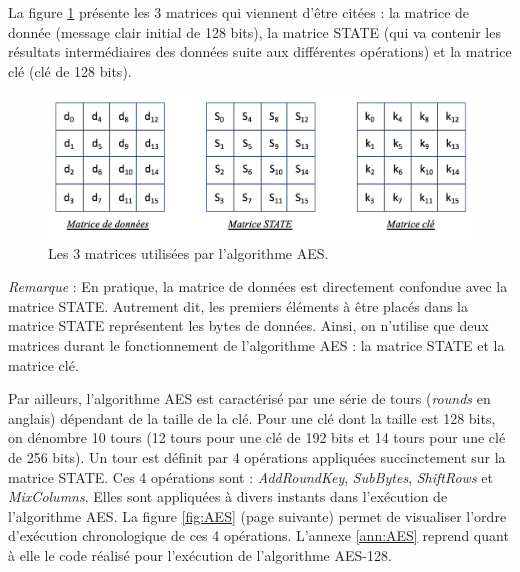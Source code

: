 \documentclass[oneside]{book}
\begin{document}
La figure \ref{fig:matrix} présente les 3 matrices qui viennent d'être citées : la matrice de donnée (message clair initial de 128 bits), la matrice STATE (qui va contenir les résultats intermédiaires des données suite aux différentes opérations) et la matrice clé (clé de 128 bits).
\begin{figure}[htbp]
    \centering
    \includegraphics[scale=0.75]{image/matrix}
    \caption{Les 3 matrices utilisées par l'algorithme AES.}
    \label{fig:matrix}
\end{figure}

\textit{Remarque} : En pratique, la matrice de données est directement confondue avec la matrice STATE. Autrement dit, les premiers éléments à être placés dans la matrice STATE représentent les bytes de données. Ainsi, on n'utilise que deux matrices durant le fonctionnement de l'algorithme AES : la matrice STATE et la matrice clé.

Par ailleurs, l'algorithme AES est caractérisé par une série de tours (\textit{rounds} en anglais) dépendant de la taille de la clé. Pour une clé dont la taille est 128 bits, on dénombre 10 tours (12 tours pour une clé de 192 bits et 14 tours pour une clé de 256 bits). Un tour est définit par 4 opérations appliquées succinctement sur la matrice STATE. Ces 4 opérations sont : \textit{AddRoundKey}, \textit{SubBytes}, \textit{ShiftRows} et \textit{MixColumns}. Elles sont appliquées à divers instants dans l'exécution de l'algorithme AES. La figure \ref{fig:AES} (page suivante) permet de visualiser l'ordre d'exécution chronologique de ces 4 opérations. L'annexe \ref{ann:AES} reprend quant à elle le code réalisé pour l'exécution de l'algorithme AES-128.

\newpage
\end{document}
